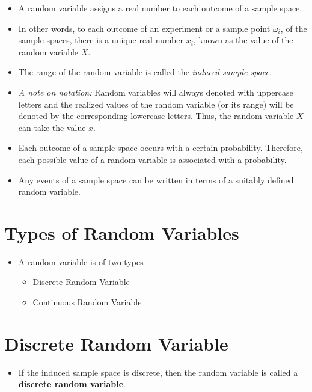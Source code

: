\documentclass[]{book}
\providecommand{\tightlist}{%
  \setlength{\itemsep}{0pt}\setlength{\parskip}{0pt}}
\begin{document}
\begin{itemize}
\tightlist
\item
  A random variable assigns a real number to each outcome of a sample space.
\item
  In other words, to each outcome of an experiment or a sample point \(\omega_i\), of the sample spaces, there is a unique real number \(x_i\), known as the value of the random variable \(X\).
\item
  The range of the random variable is called the \emph{induced sample space}.
\item
  \emph{A note on notation:} Random variables will always denoted with uppercase letters and the realized values of the random variable (or its range) will be denoted by the corresponding lowercase letters. Thus, the random variable \(X\) can take the value \(x\).
\item
  Each outcome of a sample space occurs with a certain probability. Therefore, each possible value of a random variable is associated with a probability.
\item
  Any events of a sample space can be written in terms of a suitably defined random variable.
\end{itemize}

\hypertarget{types-of-random-variables}{%
\section{Types of Random Variables}\label{types-of-random-variables}}

\begin{itemize}
\tightlist
\item
  A random variable is of two types

  \begin{itemize}
  \tightlist
  \item
    Discrete Random Variable
  \item
    Continuous Random Variable
  \end{itemize}
\end{itemize}

\hypertarget{discrete-random-variable}{%
\section{Discrete Random Variable}\label{discrete-random-variable}}

\begin{itemize}
\tightlist
\item
  If the induced sample space is discrete, then the random variable is called a \textbf{discrete random variable}.
\end{itemize}
\end{document}
